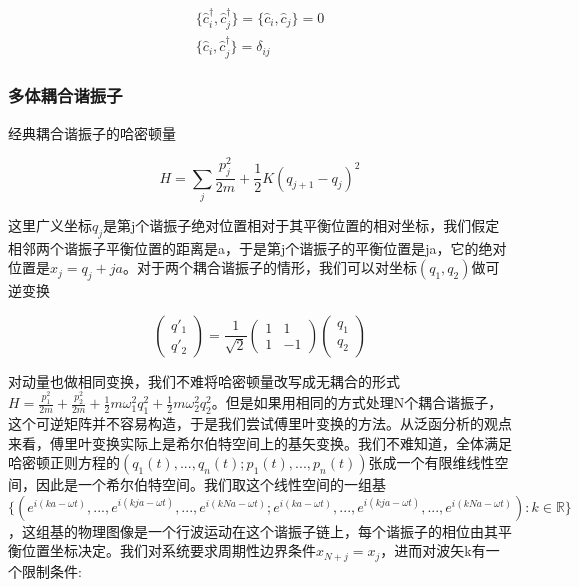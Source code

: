 \begin{equation}
    \begin{split}
        \{\hat{c}_i^\dagger,\hat{c}_j^\dagger\}=\{\hat{c}_i,\hat{c}_j\}=0 \\
        \{\hat{c}_i,\hat{c}_j^\dagger\}=\delta_{ij}
    \end{split}
\end{equation}


\subsubsection{多体耦合谐振子}

经典耦合谐振子的哈密顿量

\begin{equation}
	H=\sum_{j}\frac{p_j^2}{2m}+\frac{1}{2}K(q_{j+1}-q_j)^2
\end{equation}

这里广义坐标$q_j$是第j个谐振子绝对位置相对于其平衡位置的相对坐标，我们假定相邻两个谐振子平衡位置的距离是a，于是第j个谐振子的平衡位置是ja，它的绝对位置是$x_j=q_j+ja$。对于两个耦合谐振子的情形，我们可以对坐标$(q_1,q_2)$做可逆变换

\begin{equation}
    \left(\begin{matrix}
        q'_1 \\ q'_2
    \end{matrix}
    \right) = \frac{1}{\sqrt{2}}\left(
    \begin{matrix}
        1 & 1 \\
        1 & -1 
    \end{matrix} \right) \left(
    \begin{matrix}
        q_1 \\ q_2
    \end{matrix}    
    \right)
\end{equation}

对动量也做相同变换，我们不难将哈密顿量改写成无耦合的形式$H=\frac{p_1^2}{2m}+\frac{p_2^2}{2m}+\frac{1}{2}m\omega_1^2 q_1^2+\frac{1}{2}m\omega_2^2 q_2^2$。但是如果用相同的方式处理N个耦合谐振子，这个可逆矩阵并不容易构造，于是我们尝试傅里叶变换的方法。从泛函分析的观点来看，傅里叶变换实际上是希尔伯特空间上的基矢变换。我们不难知道，全体满足哈密顿正则方程的$(q_1(t),...,q_n(t);p_1(t),...,p_n(t))$张成一个有限维线性空间，因此是一个希尔伯特空间。我们取这个线性空间的一组基$\{(e^{i(ka-\omega t)},...,e^{i(kja-\omega t)},..., e^{i(kNa-\omega t)};e^{i(ka-\omega t)},...,e^{i(kja-\omega t)},...,e^{i(kNa-\omega t)}):k\in\mathbb{R}\}$，这组基的物理图像是一个行波运动在这个谐振子链上，每个谐振子的相位由其平衡位置坐标决定。我们对系统要求周期性边界条件$x_{N+j}=x_{j}$，进而对波矢k有一个限制条件:

